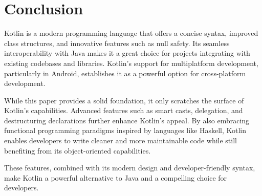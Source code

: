 \documentclass[a4paper,11pt]{article}
\begin{document}
\section{Conclusion}
Kotlin is a modern programming language that offers a concise syntax, improved class structures, and innovative features such as null safety. Its seamless interoperability with Java makes it a great choice for projects integrating with existing codebases and libraries. Kotlin's support for multiplatform development, particularly in Android, establishes it as a powerful option for cross-platform development.

While this paper provides a solid foundation, it only scratches the surface of Kotlin's capabilities. Advanced features such as smart casts, delegation, and destructuring declarations further enhance Kotlin's appeal. By also embracing functional programming paradigms inspired by languages like Haskell, Kotlin enables developers to write cleaner and more maintainable code while still benefiting from its object-oriented capabilities.

These features, combined with its modern design and developer-friendly syntax, make Kotlin a powerful alternative to Java and a compelling choice for developers.

\newpage
\printbibliography
\end{document}
